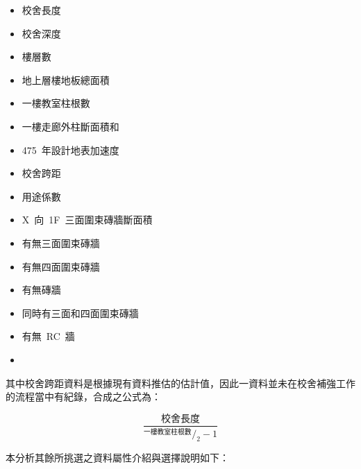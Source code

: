 \begin{multicols}{2}
\begin{itemize}
\item 校舍長度
\item 校舍深度
\item 樓層數
\item 地上層樓地板總面積
\item 一樓教室柱根數
\item 一樓走廊外柱斷面積和
\item 475~年設計地表加速度
\item 校舍跨距
\item 用途係數
\item X~向~1F~三面圍束磚牆斷面積
\item 有無三面圍束磚牆
\item 有無四面圍束磚牆
\item 有無磚牆
\item 同時有三面和四面圍束磚牆
\item 有無~RC~牆
\item[]
\end{itemize}
\end{multicols}

其中校舍跨距資料是根據現有資料推估的估計值，因此一資料並未在校舍補強工作的流程當中有紀錄，合成之公式為：

\begin{equation} \dfrac{\text{校舍長度}}{^{\text{一樓教室柱根數}}/_2 - 1} \label{eq:span}\end{equation} 

本分析其餘所挑選之資料屬性介紹與選擇說明如下：

